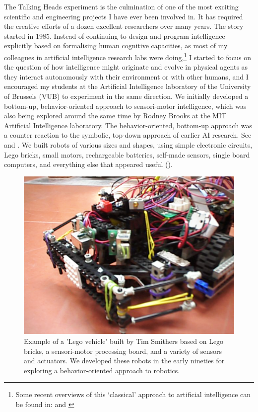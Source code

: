 The Talking Heads experiment is the culmination of one of
the most exciting scientific and engineering projects I have
ever been involved in. It has required the
creative efforts of a dozen excellent researchers 
over many years. The story started in 
1985. Instead of continuing to design and program intelligence
explicitly based on formalising human cognitive
capacities, as most of my colleagues
in artificial intelligence research 
labs were doing,\footnote{
Some recent overviews of this `classical' approach to 
artificial intelligence can be found in: \cite{Nilsson:1998} and 
\cite{Russell:1998}}
I started to focus on the 
question of how intelligence might
originate and evolve in physical agents as they 
interact autonomously with their environment or with 
other humans, and I encouraged my students
at the Artificial Intelligence laboratory of the University 
of Brussels (VUB) to experiment in the same direction. 
We initially developed a bottom-up, 
behavior-oriented approach to sensori-motor intelligence, 
which was also being explored around the same time by 
Rodney Brooks at the MIT Artificial Intelligence 
laboratory.
The behavior-oriented, bottom-up approach  was a 
counter reaction to the symbolic, top-down approach of 
earlier AI research. See \cite{Steels:1995} and \cite{Arkin:1998}. 
We built robots of various sizes and shapes, using simple
electronic circuits, Lego bricks, small motors, rechargeable
batteries, self-made 
sensors, single board computers, and everything else that 
appeared useful (). 


\begin{figure}[htbp]
  \centerline{\includegraphics[width=.60\textwidth]{chap1/figs/robot}}
\caption{ Example of a 'Lego vehicle' built by Tim Smithers based on Lego bricks, a sensori-motor processing board, 
and a variety of 
sensors and actuators. We developed these robots in the early nineties for exploring a behavior-oriented 
approach to robotics.}
\label{f:plate3}
\end{figure}


